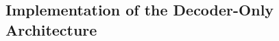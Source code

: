 \documentclass{article}
\let\cite\parencite
\begin{document}
{\subsection*{Implementation of the Decoder-Only Architecture}


}
\end{document}
